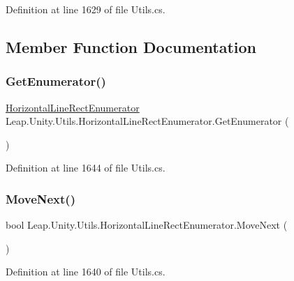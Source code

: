 Definition at line 1629 of file Utils.\+cs.



\subsection{Member Function Documentation}
\mbox{\label{struct_leap_1_1_unity_1_1_utils_1_1_horizontal_line_rect_enumerator_ad6281ec8a5551d7fb26ae1c25eba4682}} 
\subsubsection{\texorpdfstring{GetEnumerator()}{GetEnumerator()}}
{\footnotesize\ttfamily \mbox{\hyperlink{struct_leap_1_1_unity_1_1_utils_1_1_horizontal_line_rect_enumerator}{Horizontal\+Line\+Rect\+Enumerator}} Leap.\+Unity.\+Utils.\+Horizontal\+Line\+Rect\+Enumerator.\+Get\+Enumerator (\begin{DoxyParamCaption}{ }\end{DoxyParamCaption})}



Definition at line 1644 of file Utils.\+cs.

\mbox{\label{struct_leap_1_1_unity_1_1_utils_1_1_horizontal_line_rect_enumerator_abf4035ccf21b27f98d37bbd7911f4222}} 
\subsubsection{\texorpdfstring{MoveNext()}{MoveNext()}}
{\footnotesize\ttfamily bool Leap.\+Unity.\+Utils.\+Horizontal\+Line\+Rect\+Enumerator.\+Move\+Next (\begin{DoxyParamCaption}{ }\end{DoxyParamCaption})}



Definition at line 1640 of file Utils.\+cs.

